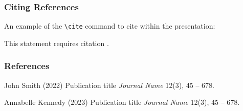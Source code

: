 \documentclass[
	11pt, %
]{beamer}
\begin{document}
\begin{frame}
    \frametitle{Citing References}

    An example of the \texttt{\textbackslash cite} command to cite within the presentation:

    \bigskip %

    This statement requires citation \cite{p1,p2}.
\end{frame}


\begin{frame} %
    \frametitle{References}

    \begin{thebibliography}{99} %
        \footnotesize %

        John Smith (2022)
        \newblock Publication title
        \newblock \emph{Journal Name} 12(3), 45 -- 678.

        Annabelle Kennedy (2023)
        \newblock Publication title
        \newblock \emph{Journal Name} 12(3), 45 -- 678.
    \end{thebibliography}
\end{frame}

\end{document}
